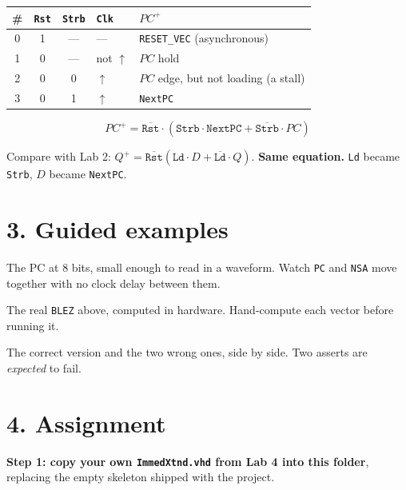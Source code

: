 \documentclass[11pt]{article}
\newcommand{\code}[1]{\texttt{#1}}
\begin{document}
\begin{center}
\begin{tabular}{cccl@{\hskip 8pt}||@{\hskip 8pt}l}
\toprule
\# & \code{Rst} & \code{Strb} & \code{Clk} & $PC^{+}$ \\
\midrule
0 & 1 & --- & --- & \code{RESET\_VEC} \quad (asynchronous) \\
1 & 0 & --- & not $\uparrow$ & $PC$ \quad hold \\
2 & 0 & 0 & $\uparrow$ & $PC$ \quad edge, but not loading (a stall) \\
3 & 0 & 1 & $\uparrow$ & \code{NextPC} \\
\bottomrule
\end{tabular}
\end{center}

\[
PC^{+} = \overline{\code{Rst}} \cdot \left( \code{Strb} \cdot \code{NextPC} + \overline{\code{Strb}} \cdot PC \right)
\]

Compare with Lab 2: $Q^{+} = \overline{\code{Rst}}(\code{Ld}\cdot D + \overline{\code{Ld}}\cdot Q)$.
\textbf{Same equation.} \code{Ld} became \code{Strb}, $D$ became \code{NextPC}.

\section*{3. Guided examples}

\begin{description}[leftmargin=2.4em,style=nextline,itemsep=2pt]
\item[Example 1 --- \code{pc\_counter}] The PC at 8 bits, small enough to read
in a waveform. Watch \code{PC} and \code{NSA} move together with no clock delay
between them.
\item[Example 2 --- \code{branch\_target}] The real \code{BLEZ} above, computed
in hardware. Hand-compute each vector before running it.
\item[Example 3 --- \code{addressing\_traps}] The correct version and the two
wrong ones, side by side. Two asserts are \emph{expected} to fail.
\end{description}

\section*{4. Assignment}

\textbf{Step 1: copy your own \code{ImmedXtnd.vhd} from Lab 4 into this folder},
replacing the empty skeleton shipped with the project.
\end{document}
